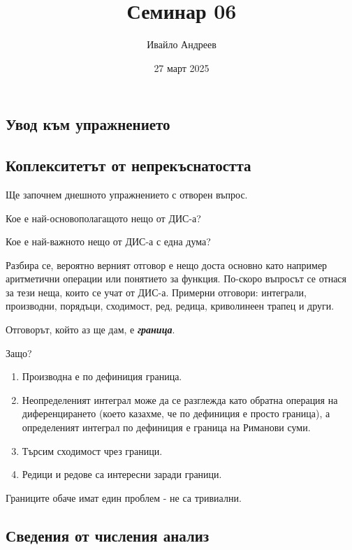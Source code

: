 \documentclass{scrartcl}
\title{Семинар 06}
\author{Ивайло Андреев}
\date{27 март 2025}
\begin{document}
\maketitle  %

\begin{flushleft}

\section{Увод към упражнението}

\subsection{Коплекситетът от непрекъснатостта}

Ще започнем днешното упражнението с отворен въпрос.

Кое е най-основополагащото нещо от ДИС-а?

\begin{mdframed}[linewidth=1.5pt, linecolor=black]
Кое е най-важното нещо от ДИС-а с една дума?
\end{mdframed}

Разбира се, вероятно верният отговор е нещо доста основно като например аритметични операции или понятието за функция. По-скоро въпросът се отнася за тези неща, които се учат от ДИС-а. Примерни отговори: интеграли, производни, порядъци, сходимост, ред, редица, криволинеен трапец и други.

\begin{mdframed}[linewidth=1.5pt, linecolor=black]
Отговорът, който аз ще дам, е \textbf{\textit{граница}}.
\end{mdframed}

Защо?
\begin{enumerate}
    \item Производна е по дефиниция граница.
    \item Неопределеният интеграл може да се разглежда като обратна операция на диференцирането (което казахме, че по дефиниция е просто граница), а определеният интеграл по дефиниция е граница на Риманови суми.
    \item Търсим сходимост чрез граници.
    \item Редици и редове са интересни заради граници.
\end{enumerate}

Границите обаче имат един проблем - не са тривиални.

\subsection{Сведения от числения анализ}


\end{flushleft}
\end{document}
